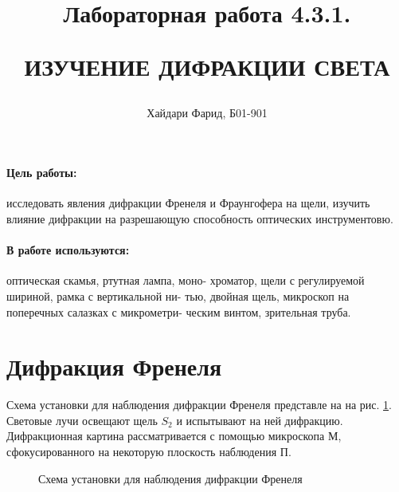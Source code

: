 \documentclass[a5paper,10pt, twoside]{article} %
\title
{
	\hfill \break	\hfill \break
	\hfill \break	\hfill \break
	Лабораторная работа 4.3.1.
	
	ИЗУЧЕНИЕ ДИФРАКЦИИ СВЕТА
}
\author{Хайдари Фарид, Б01-901}
\begin{document}
	
\maketitle


\thispagestyle{empty} %

\newpage

\tableofcontents %

\newpage


\paragraph{Цель работы:}

	исследовать явления дифракции Френеля и Фраунгофера на щели, изучить влияние дифракции на 
	разрешающую способность оптических инструментовю.

\paragraph{В работе используются:}

	оптическая скамья, ртутная лампа, моно-
	хроматор, щели с регулируемой шириной, рамка с вертикальной ни-
	тью, двойная щель, микроскоп на поперечных салазках с микрометри-
	ческим винтом, зрительная труба.


\section{Дифракция Френеля}
	Схема установки для наблюдения дифракции Френеля представле на на рис. \ref{img:scheme0}.
	Световые лучи освещают щель $S_2$ и испытывают на ней дифракцию. Дифракционная картина
	рассматривается с помощью микроскопа $\text{М}$, сфокусированного на некоторую плоскость
	наблюдения $\text{П}$.

	\begin{figure}[h]
		\caption{Схема установки для наблюдения дифракции Френеля}
		\label{img:scheme0}
	\end{figure}
\end{document}

